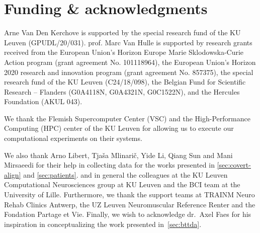 \chapter*{Funding \& acknowledgments}

Arne Van Den Kerchove is supported by the special research fund of the KU Leuven
(GPUDL/20/031).
prof. Marc Van Hulle is supported by research grants received from
the European Union’s Horizon Europe Marie Sklodowska-Curie Action program
(grant agreement No. 101118964), the European Union’s Horizon 2020 research and
innovation program (grant agreement No. 857375), the special research fund of
the KU Leuven (C24/18/098), the Belgian Fund for Scientific Research – Flanders
(G0A4118N, G0A4321N, G0C1522N), and the Hercules
Foundation (AKUL 043).

We thank the Flemish Supercomputer Center (VSC) and the High-Performance
Computing (HPC) center of the KU Leuven for allowing us to execute our
computational experiments on their systems.

We also thank  Arno Libert,
Tjaša Mlinarič, Yide Li, Qiang Sun and Mani Mirsaeedi for their help in collecting data
for the works presented in \autoref{sec:covert-align} and
\autoref{sec:patients}.
and in general the colleagues at the KU Leuven Computational Neurosciences
group at KU Leuven and the BCI team at the University of Lille.
Furthermore, we thank the support teams at TRAINM Neuro Rehab Clinics Antwerp,
the UZ Leuven Neuromuscular Reference Renter and the Fondation Partage et Vie.
Finally, we wish to acknowledge dr.\ Axel Faes for his inspiration in conceptualizing
the work presented in~\autoref{sec:bttda}.
